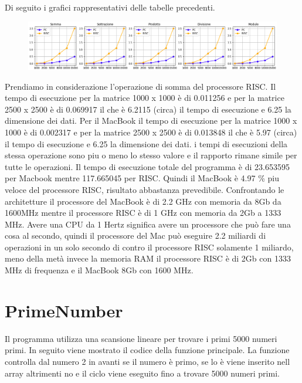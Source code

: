 \documentclass[12pt,a4paper]{report}
\begin{document}
	Di seguito i grafici rappresentativi delle tabelle precedenti.
	\begin{figure}
	\centering
		\includegraphics[scale= 0.4]{PorzioniCodice/Operazioni/Grafico.png}
	\end{figure}
	Prendiamo in considerazione l'operazione di somma del processore RISC. Il tempo di esecuzione per la matrice 1000 x 1000 è di 0.011256 e per la matrice 2500 x 2500 è di  0.069917 il che è 6.2115 (circa) il tempo di esecuzione e 6.25 la dimensione dei dati.  Per il MacBook il tempo di esecuzione per la matrice 1000 x 1000 è di 0.002317 e per la matrice 2500 x 2500 è di  0.013848 il che è 5.97 (circa) il tempo di esecuzione e 6.25 la dimensione dei dati.  i tempi di esecuzioni della stessa operazione sono piu o meno lo stesso valore e il rapporto rimane simile per tutte le operazioni.
	Il tempo di esecuzione totale del programma è di 23.653595 per Macbook mentre 117.665045 per RISC. Quindi il MacBook è 4.97 \% piu veloce del processore RISC, risultato abbastanza prevedibile. Confrontando le architetture il processore del MacBook è di 2.2 GHz con memoria da 8Gb da 1600MHz mentre il processore RISC è di 1 GHz con memoria da 2Gb a 1333 MHz.
	Avere una CPU da 1 Hertz significa avere un processore che può fare una cosa al secondo,  quindi il processore del Mac può eseguire 2.2 miliardi di operazioni in un solo secondo di contro il processore RISC solamente 1 miliardo, meno della metà invece la memoria RAM il processore RISC è di 2Gb con 1333 MHz di frequenza e il MacBook 8Gb con 1600 MHz.



\section{PrimeNumber}
Il programma utilizza una scansione lineare per trovare i primi 5000 numeri primi. In seguito viene mostrato il codice della funzione principale.  La funzione controlla dal numero 2 in avanti se il numero è primo, se lo è viene inserito nell array altrimenti no e il ciclo viene eseguito fino a trovare 5000 numeri primi.  
\end{document}
